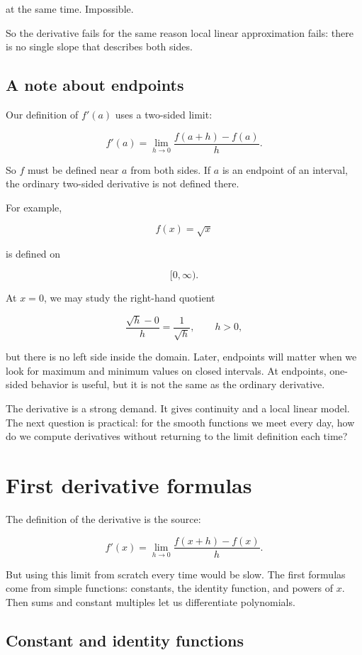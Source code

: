 at the same time.  Impossible.

So the derivative fails for the same reason local linear approximation fails: there is no single slope that describes both sides.

\subsection{A note about endpoints}
\label{subsec:derivative-endpoints-note}

Our definition of \(f'(a)\) uses a two-sided limit:

\[
f'(a)=\lim_{h\to0}\frac{f(a+h)-f(a)}{h}.
\]

So \(f\) must be defined near \(a\) from both sides.  If \(a\) is an endpoint of an interval, the ordinary two-sided derivative is not defined there.

For example,

\[
f(x)=\sqrt{x}
\]

is defined on

\[
[0,\infty).
\]

At \(x=0\), we may study the right-hand quotient

\[
\frac{\sqrt{h}-0}{h}
=
\frac{1}{\sqrt{h}},
\qquad h>0,
\]

but there is no left side inside the domain.  Later, endpoints will matter when we look for maximum and minimum values on closed intervals.  At endpoints, one-sided behavior is useful, but it is not the same as the ordinary derivative.

The derivative is a strong demand.  It gives continuity and a local linear model.  The next question is practical: for the smooth functions we meet every day, how do we compute derivatives without returning to the limit definition each time?

\section{First derivative formulas}
\label{sec:first-derivative-formulas}

The definition of the derivative is the source:

\[
f'(x)=\lim_{h\to0}\frac{f(x+h)-f(x)}{h}.
\]

But using this limit from scratch every time would be slow.  The first formulas come from simple functions: constants, the identity function, and powers of \(x\).  Then sums and constant multiples let us differentiate polynomials.

\subsection{Constant and identity functions}
\label{subsec:constant-identity-functions}


